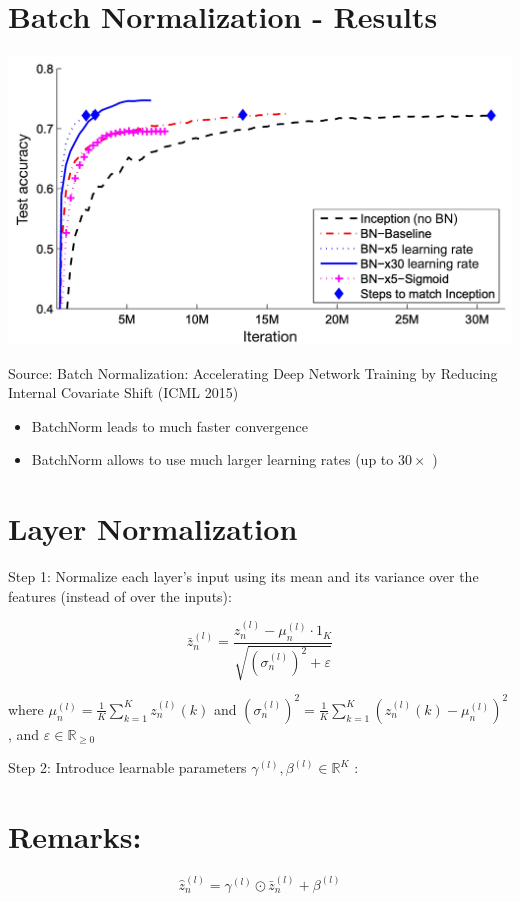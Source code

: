 \documentclass[10pt]{article}
\begin{document}
\section*{Batch Normalization - Results}
\begin{center}
\includegraphics[max width=\textwidth]{2023_12_30_360102aa01a03e5a4270g-30}
\end{center}

Source: Batch Normalization: Accelerating Deep Network Training by Reducing Internal Covariate Shift (ICML 2015)

\begin{itemize}
  \item BatchNorm leads to much faster convergence
  \item BatchNorm allows to use much larger learning rates (up to $30 \times$ )
\end{itemize}

\section*{Layer Normalization}
Step 1: Normalize each layer's input using its mean and its variance over the features (instead of over the inputs):

$$
\bar{z}_{n}^{(l)}=\frac{z_{n}^{(l)}-\mu_{n}^{(l)} \cdot 1_{K}}{\sqrt{\left(\sigma_{n}^{(l)}\right)^{2}+\varepsilon}}
$$

where $\mu_{n}^{(l)}=\frac{1}{K} \sum_{k=1}^{K} z_{n}^{(l)}(k)$ and $\left(\sigma_{n}^{(l)}\right)^{2}=\frac{1}{K} \sum_{k=1}^{K}\left(z_{n}^{(l)}(k)-\mu_{n}^{(l)}\right)^{2}$, and $\varepsilon \in \mathbb{R}_{\geq 0}$

Step 2: Introduce learnable parameters $\gamma^{(l)}, \beta^{(l)} \in \mathbb{R}^{K}$ :

\section*{Remarks:}
$$
\hat{z}_{n}^{(l)}=\gamma^{(l)} \odot \bar{z}_{n}^{(l)}+\beta^{(l)}
$$
\end{document}
